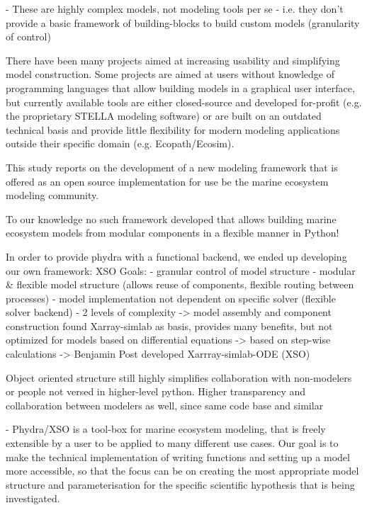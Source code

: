 \documentclass[journal abbreviation, manuscript]{copernicus}
\begin{document}
- These are highly complex models, not modeling tools per se
- i.e. they don't provide a basic framework of building-blocks to build custom models (granularity of control)

There have been many projects aimed at increasing usability and simplifying model construction. Some projects are aimed at users without knowledge of programming languages that allow building models in a graphical user interface, but currently available tools are either closed-source and developed for-profit (e.g. the proprietary STELLA modeling software) or are built on an outdated technical basis and provide little flexibility for modern modeling applications outside their specific domain (e.g. Ecopath/Ecosim).



This study reports on the development of a new modeling framework that is offered as an open source implementation for use be the marine ecosystem modeling community.

To our knowledge no such framework developed that allows building marine ecosystem models from modular components in a flexible manner in Python!

In order to provide phydra with a functional backend, we ended up developing our own framework: XSO
Goals:
- granular control of model structure
- modular \& flexible model structure (allows reuse of components, flexible routing between processes)
- model implementation not dependent on specific solver (flexible solver backend)
- 2 levels of complexity -> model assembly and component construction
found Xarray-simlab as basis, provides many benefits, but not optimized for models based on differential equations -> based on step-wise calculations
-> Benjamin Post developed Xarrray-simlab-ODE (XSO) 

Object oriented structure still highly simplifies collaboration with non-modelers or people not versed in higher-level python. Higher transparency and collaboration between modelers as well, since same code base and similar 

- Phydra/XSO is a tool-box for marine ecosystem modeling, that is freely extensible by a user to be applied to many different use cases. Our goal is to make the technical implementation of writing functions and setting up a model more accessible, so that the focus can be on creating the most appropriate model structure and parameterisation for the specific scientific hypothesis that is being investigated. 
\end{document}
